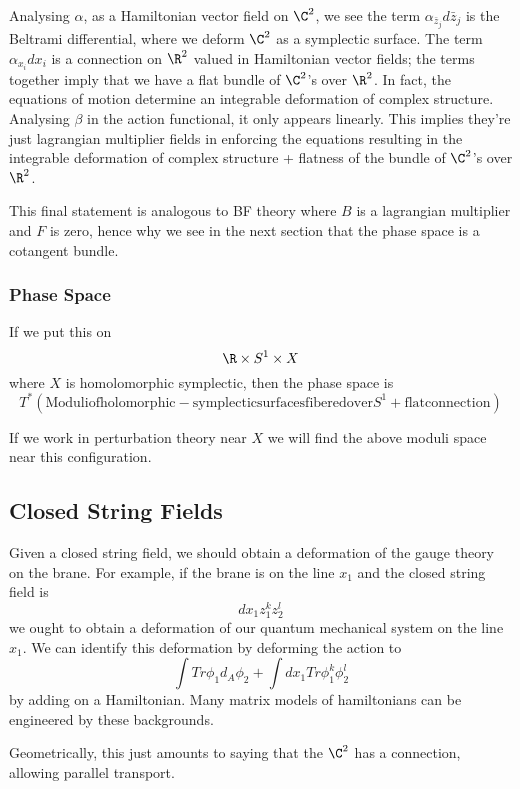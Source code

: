 \documentclass[12pt]{amsart}
\begin{document}
Analysing $\alpha$, as a Hamiltonian vector field on $\C^2$, we see the
term $\alpha_{\bar{z}_j}d\bar{z}_j$ is the Beltrami differential, where we
deform $\C^2$ as a symplectic surface. The term $\alpha_{x_i}dx_i$ is a
connection on $\R^2$ valued in Hamiltonian vector fields; the terms together
imply that we have a flat bundle of $\C^2$'s over $\R^2$. In fact, the
equations of motion determine an integrable deformation of complex structure.
Analysing $\beta$ in the action functional, it only appears linearly. This
implies they're just lagrangian multiplier fields in enforcing the equations
resulting in the integrable deformation of complex structure + flatness of the
bundle of $\C^2$'s over $\R^2$.
\begin{rmk}
  This final statement is analogous to BF theory where $B$ is a lagrangian
  multiplier and $F$ is zero, hence why we see in the next section that the
  phase space is a cotangent bundle.
\end{rmk}

\subsubsection{Phase Space}
If we put this on $$\R \times S^1 \times X$$ where $X$ is homolomorphic
symplectic, then the phase space is $$T^*(\mathrm{Moduli of
holomorphic-symplectic surfaces fibered over} S^1 + \mathrm{flat
connection})$$
\begin{rmk}
  If we work in perturbation theory near $X$ we will find the above moduli
  space near this configuration.
\end{rmk}

\subsection{Closed String Fields}

Given a closed string field, we should obtain a deformation of the gauge theory
on the brane. For example, if the brane is on the line $x_1$ and the closed
string  field is $$dx_1 z_1^k z_2^l$$ we ought to obtain a deformation of our
quantum mechanical system on the line $x_1$. We can identify this deformation
by deforming the action to $$\int Tr \phi_1 d_A \phi_2 + \int dx_1 Tr \phi_1^k
\phi_2^l$$ by adding on a Hamiltonian. Many matrix models of hamiltonians can
be engineered by these backgrounds.

\begin{rmk}
  Geometrically, this just amounts to saying that the $\C^2$ has a connection,
  allowing parallel transport.
\end{rmk}
\end{document}
